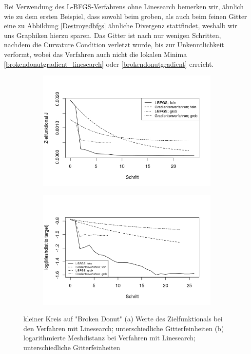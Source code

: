 Bei Verwendung des L-BFGS-Verfahrens ohne Linesearch bemerken wir, ähnlich wie zu dem ersten Beispiel, dass sowohl beim groben, als auch beim feinen Gitter eine zu Abbildung \ref{Destroyedbfgs} ähnliche Divergenz stattfindet, weshalb wir uns Graphiken hierzu sparen. Das Gitter ist nach nur wenigen Schritten, nachdem die Curvature Condition verletzt wurde, bis zur Unkenntlichkeit verformt, wobei das Verfahren auch nicht die lokalen Minima \ref{brokendonutgradient_linesearch} oder \ref{brokendonutgradient} erreicht. 

\begin{figure}
	\begin{subfigure}{0.5\textwidth}
	\centering
	\includegraphics[scale=0.48]{plot_donut_target.jpeg}
	\caption{}	
	\end{subfigure}
	\begin{subfigure}{0.5\textwidth}
	\centering
	\includegraphics[scale=0.48]{plot_donut_meshdist.jpeg}
	\caption{}	
	\end{subfigure}
\caption{kleiner Kreis auf "Broken Donut" (a) Werte des Zielfunktionals bei den Verfahren mit Linesearch; unterschiedliche Gitterfeinheiten (b) logarithmierte Meshdistanz bei Verfahren mit Linesearch; unterschiedliche Gitterfeinheiten}
\label{plot_konvergenzdonut}
\end{figure}


